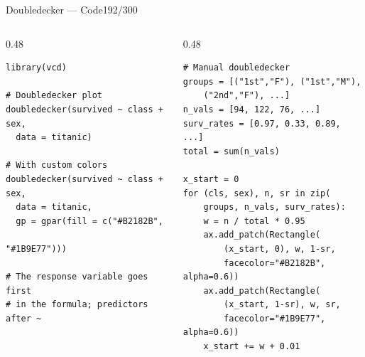 \documentclass[10pt]{beamer}
\newcommand{\smark}[1]{\hfill{\scriptsize\color{codegray}#1}}
\begin{document}
\begin{frame}[fragile]{Doubledecker --- Code}\smark{192/300}
\begin{columns}[T]
\begin{column}{0.48\textwidth}
\begin{lstlisting}[style=Rstyle]
library(vcd)

# Doubledecker plot
doubledecker(survived ~ class + sex,
  data = titanic)

# With custom colors
doubledecker(survived ~ class + sex,
  data = titanic,
  gp = gpar(fill = c("#B2182B",
                      "#1B9E77")))

# The response variable goes first
# in the formula; predictors after ~
\end{lstlisting}
\end{column}
\begin{column}{0.48\textwidth}
\begin{lstlisting}[style=Pystyle]
# Manual doubledecker
groups = [("1st","F"), ("1st","M"),
    ("2nd","F"), ...]
n_vals = [94, 122, 76, ...]
surv_rates = [0.97, 0.33, 0.89, ...]
total = sum(n_vals)

x_start = 0
for (cls, sex), n, sr in zip(
    groups, n_vals, surv_rates):
    w = n / total * 0.95
    ax.add_patch(Rectangle(
        (x_start, 0), w, 1-sr,
        facecolor="#B2182B", alpha=0.6))
    ax.add_patch(Rectangle(
        (x_start, 1-sr), w, sr,
        facecolor="#1B9E77", alpha=0.6))
    x_start += w + 0.01
\end{lstlisting}
\end{column}
\end{columns}
\end{frame}
\end{document}
